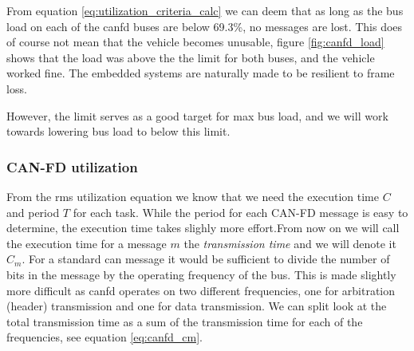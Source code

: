 From equation \ref{eq:utilization_criteria_calc} we can deem that as long as the bus load on each of the \acrshort{canfd} buses are below 69.3\%, no messages are lost. This does of course not mean that the vehicle becomes unusable, figure \ref{fig:canfd_load} shows that the load was above the the limit for both buses, and the vehicle worked fine. The embedded systems are naturally made to be resilient to frame loss.

However, the limit serves as a good target for max bus load, and we will work towards lowering bus load to below this limit.






\subsubsection{CAN-FD utilization}

From the \acrshort{rms} utilization equation we know that we need the execution time $C$ and period $T$ for each task. While the period for each CAN-FD message is easy to determine, the execution time takes slighly more effort.From now on we will call the execution time for a message $m$ the \emph{transmission time} and we will denote it $C_m$. For a standard \acrshort{can} message it would be sufficient to divide the number of bits in the message by the operating frequency of the bus. This is made slightly more difficult as \acrshort{canfd} operates on two different frequencies, one for arbitration (header) transmission and one for data transmission. We can split look at the total transmission time as a sum of the transmission time for each of the frequencies, see equation \ref{eq:canfd_cm}.  

